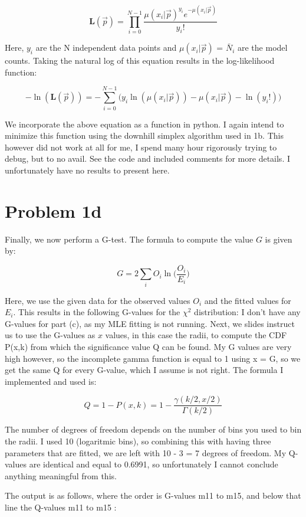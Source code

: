 \begin{equation}
	\textbf{L}(\vec{p}) = \prod_{i=0}^{N-1} \frac{\mu(x_i | \vec{p})^{y_i} e^{-\mu(x_i | \vec{p})}}{y_i!}
\end{equation}

Here, $y_i$ are the N independent data points and $\mu(x_i | \vec{p})$ = $\bar{N}_i$ are the model counts. Taking the natural log of this equation results in the log-likelihood function:

\begin{equation}
	- \ln(\textbf{L}(\vec{p})) = - \sum_{i=0}^{N-1} \Big( y_i \ln (\mu(x_i | \vec{p})) - \mu(x_i | \vec{p}) - \ln(y_i!) \Big)
\end{equation}	

We incorporate the above equation as a function in python. I again intend to minimize this function using the downhill simplex algorithm used in 1b. This however did not work at all for me, I spend many hour rigorously trying to debug, but to no avail. See the code and included comments for more details. I unfortunately have no results to present here. 

\section*{Problem 1d}

Finally, we now perform a G-test. The formula to compute the value $G$ is given by:

\begin{equation}
	G = 2 \sum_{i} O_i \ln\Big( \frac{O_i}{E_i}\Big)
\end{equation}

Here, we use the given data for the observed values $O_i$ and the fitted values for $E_i$. This results in the following G-values for the $\chi^2$ distribution:
I don't have any G-values for part (c), as my MLE fitting is not running. Next, we slides instruct us to use the G-values as $x$ values, in this case the radii, to compute the CDF P(x,k) from which the significance value Q can be found. My G values are very high however, so the incomplete gamma function is equal to 1 using x = G, so we get the same Q for every G-value, which I assume is not right. The formula I implemented and used is:

\begin{equation}
	Q = 1 - P(x,k) = 1 - \frac{\gamma (k/2 , x/2)}{\Gamma (k/2)}
\end{equation}

The number of degrees of freedom depends on the number of bins you used to bin the radii. I used 10 (logaritmic bins), so combining this with having three parameters that are fitted, we are left with 10 - 3 = 7 degrees of freedom. My Q-values are identical and equal to 0.6991, so unfortunately I cannot conclude anything meaningful from this. 

The output is as follows, where the order is G-values m11 to m15, and below that line the Q-values m11 to m15 :\\


















